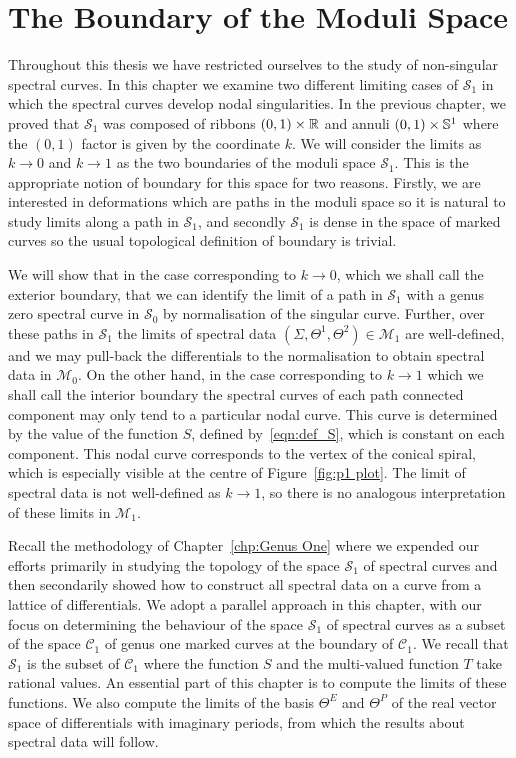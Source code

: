 
\chapter{The Boundary of the Moduli Space}
\label{chp:Moduli Boundary}

Throughout this thesis we have restricted ourselves to the study of non-singular spectral curves. In this chapter we examine two different limiting cases of $\mathcal{S}_1$ in which the spectral curves develop nodal singularities.
In the previous chapter, we proved that $\mathcal{S}_1$ was composed of ribbons $(0,1)\times \R$ and annuli $(0,1) \times \S^1$ where the $(0,1)$ factor is given by the coordinate $k$. We will consider the limits as $k \to 0$ and $k \to 1$ as the two boundaries of the moduli space $\mathcal{S}_1$. This is the appropriate notion of boundary for this space for two reasons. Firstly, we are interested in deformations which are paths in the moduli space so it is natural to study limits along a path in $\mathcal{S}_1$, and secondly $\mathcal{S}_1$ is dense in the space of marked curves so the usual topological definition of boundary is trivial.

We will show that in the case corresponding to $k \to 0$, which we shall call the exterior boundary, that we can identify the limit of a path in $\mathcal{S}_1$ with a genus zero spectral curve in $\mathcal{S}_0$ by normalisation of the singular curve. Further, over these paths in $\mathcal{S}_1$ the limits of spectral data $(Σ,Θ^1,Θ^2) \in \mathcal{M}_1$ are well-defined, and we may pull-back the differentials to the normalisation to obtain spectral data in $\mathcal{M}_0$. On the other hand, in the case corresponding to $k \to 1$ which we shall call the interior boundary the spectral curves of each path connected component may only tend to a particular nodal curve. This curve is determined by the value of the function $S$, defined by~\eqref{eqn:def_S}, which is constant on each component. This nodal curve corresponds to the vertex of the conical spiral, which is especially visible at the centre of Figure~\ref{fig:p1 plot}. The limit of spectral data is not well-defined as $k \to 1$, so there is no analogous interpretation of these limits in $\mathcal{M}_1$.

Recall the methodology of Chapter~\ref{chp:Genus One} where we expended our efforts primarily in studying the topology of the space $\mathcal{S}_1$ of spectral curves and then secondarily showed how to construct all spectral data on a curve from a lattice of differentials.
We adopt a parallel approach in this chapter, with our focus on determining the behaviour of the space $\mathcal{S}_1$ of spectral curves as a subset of the space $\mathcal{C}_1$ of genus one marked curves at the boundary of $\mathcal{C}_1$. We recall that $\mathcal{S}_1$ is the subset of $\mathcal{C}_1$ where the function $S$ and the multi-valued function $T$ take rational values. An essential part of this chapter is to compute the limits of these functions. We also compute the limits of the basis $Θ^E$ and $Θ^P$ of the real vector space of differentials with imaginary periods, from which the results about spectral data will follow.

